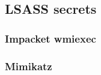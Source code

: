 \documentclass{article}
\begin{document}
\subsection{LSASS secrets}
\subsubsection{Impacket wmiexec}
\subsubsection{Mimikatz}
\end{document}
